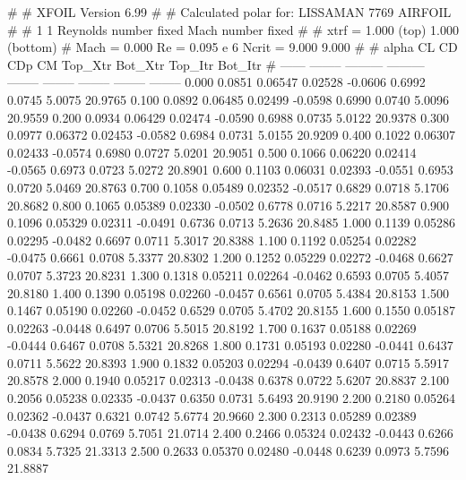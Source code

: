 #  
#       XFOIL         Version 6.99
#  
# Calculated polar for: LISSAMAN 7769 AIRFOIL                           
#  
# 1 1 Reynolds number fixed          Mach number fixed         
#  
# xtrf =   1.000 (top)        1.000 (bottom)  
# Mach =   0.000     Re =     0.095 e 6     Ncrit =   9.000  9.000
#  
#   alpha    CL        CD       CDp       CM     Top_Xtr  Bot_Xtr  Top_Itr  Bot_Itr
#  ------ -------- --------- --------- -------- -------- -------- -------- --------
   0.000   0.0851   0.06547   0.02528  -0.0606   0.6992   0.0745   5.0075  20.9765
   0.100   0.0892   0.06485   0.02499  -0.0598   0.6990   0.0740   5.0096  20.9559
   0.200   0.0934   0.06429   0.02474  -0.0590   0.6988   0.0735   5.0122  20.9378
   0.300   0.0977   0.06372   0.02453  -0.0582   0.6984   0.0731   5.0155  20.9209
   0.400   0.1022   0.06307   0.02433  -0.0574   0.6980   0.0727   5.0201  20.9051
   0.500   0.1066   0.06220   0.02414  -0.0565   0.6973   0.0723   5.0272  20.8901
   0.600   0.1103   0.06031   0.02393  -0.0551   0.6953   0.0720   5.0469  20.8763
   0.700   0.1058   0.05489   0.02352  -0.0517   0.6829   0.0718   5.1706  20.8682
   0.800   0.1065   0.05389   0.02330  -0.0502   0.6778   0.0716   5.2217  20.8587
   0.900   0.1096   0.05329   0.02311  -0.0491   0.6736   0.0713   5.2636  20.8485
   1.000   0.1139   0.05286   0.02295  -0.0482   0.6697   0.0711   5.3017  20.8388
   1.100   0.1192   0.05254   0.02282  -0.0475   0.6661   0.0708   5.3377  20.8302
   1.200   0.1252   0.05229   0.02272  -0.0468   0.6627   0.0707   5.3723  20.8231
   1.300   0.1318   0.05211   0.02264  -0.0462   0.6593   0.0705   5.4057  20.8180
   1.400   0.1390   0.05198   0.02260  -0.0457   0.6561   0.0705   5.4384  20.8153
   1.500   0.1467   0.05190   0.02260  -0.0452   0.6529   0.0705   5.4702  20.8155
   1.600   0.1550   0.05187   0.02263  -0.0448   0.6497   0.0706   5.5015  20.8192
   1.700   0.1637   0.05188   0.02269  -0.0444   0.6467   0.0708   5.5321  20.8268
   1.800   0.1731   0.05193   0.02280  -0.0441   0.6437   0.0711   5.5622  20.8393
   1.900   0.1832   0.05203   0.02294  -0.0439   0.6407   0.0715   5.5917  20.8578
   2.000   0.1940   0.05217   0.02313  -0.0438   0.6378   0.0722   5.6207  20.8837
   2.100   0.2056   0.05238   0.02335  -0.0437   0.6350   0.0731   5.6493  20.9190
   2.200   0.2180   0.05264   0.02362  -0.0437   0.6321   0.0742   5.6774  20.9660
   2.300   0.2313   0.05289   0.02389  -0.0438   0.6294   0.0769   5.7051  21.0714
   2.400   0.2466   0.05324   0.02432  -0.0443   0.6266   0.0834   5.7325  21.3313
   2.500   0.2633   0.05370   0.02480  -0.0448   0.6239   0.0973   5.7596  21.8887
